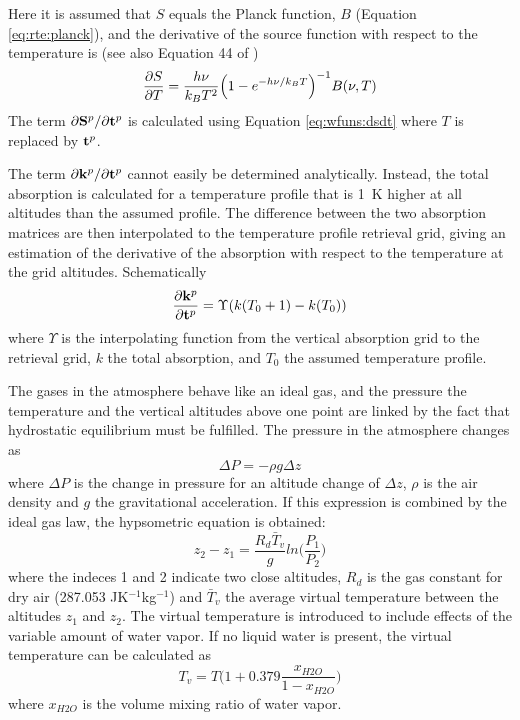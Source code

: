  Here it is assumed that $S$ equals the Planck function, $B$
 (Equation \ref{eq:rte:planck}), and the derivative of the source
 function with respect to the temperature is (see also Equation 44 of
 \citet{eriksson:00a})
 \begin{equation}
   \frac{\partial S}{\partial T} = \frac{h\nu}{k_BT^2}
        \Big( 1-e^{-h\nu/k_BT}  \Big)^{-1}B(\nu,T)
   \label{eq:wfuns:dsdt}
 \end{equation}
 The term $\partial \mathbf{S}^p / \partial \mathbf{t}^p$ is calculated
 using Equation \ref{eq:wfuns:dsdt} where $T$ is replaced by $\mathbf{t}^p$.

 The term $\partial \mathbf{k}^p/\partial \mathbf{t}^p$ cannot easily be
 determined analytically. Instead, the total absorption is calculated
 for a temperature profile that is 1~K higher at all altitudes than
 the assumed profile. The difference between the two absorption
 matrices are then interpolated to the temperature profile retrieval
 grid, giving an estimation of the derivative of the absorption
 with respect to the temperature at the grid altitudes. Schematically
 \begin{eqnarray}
   \frac{\partial \mathbf{k}^p}{\partial \mathbf{t}^p} = \Upsilon(k(T_0+1)-k(T_0))
     \nonumber
 \end{eqnarray}
 where $\Upsilon$ is the interpolating function from the vertical
 absorption grid to the retrieval grid, $k$ the total absorption, and
 $T_0$ the assumed temperature profile.

 

 
 The gases in the atmosphere behave like an ideal gas, and the pressure
 the temperature and the vertical altitudes above one point are
 linked by the fact that hydrostatic equilibrium must be fulfilled. The
 pressure in the atmosphere changes as
 \begin{equation}
   \Delta P = -\rho g \Delta z
 \end{equation}
 where $\Delta P$ is the change in pressure for an altitude change of
 $\Delta z$, $\rho$ is the air density and $g$ the gravitational 
 acceleration. If this expression is combined by the ideal gas law, the
 hypsometric equation is obtained:
 \begin{equation}
   z_2 - z_1 = \frac{R_d\bar{T}_v}{g}ln\Big( \frac{P_1}{P_2} \Big)
 \end{equation}
 where the indeces 1 and 2 indicate two close altitudes, $R_d$ is the
 gas constant for dry air (287.053 JK$^{-1}$kg$^{-1}$) and $\bar{T}_v$
 the average virtual temperature between the altitudes $z_1$ and
 $z_2$.  The virtual temperature is introduced to include effects of
 the variable amount of water vapor. If no liquid water is present, the
 virtual temperature can be calculated as
 \begin{equation}
   T_v = T \Big( 1+0.379\frac{x_{H2O}}{1-x_{H2O}}  \Big)
 \end{equation}
 where $x_{H2O}$ is the volume mixing ratio of water vapor. 

